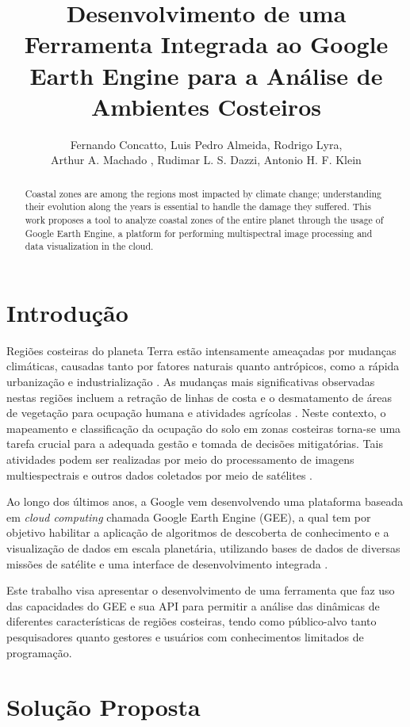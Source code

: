 \documentclass[12pt]{article}
\title{
  Desenvolvimento de uma Ferramenta Integrada ao Google Earth Engine para
  a Análise de Ambientes Costeiros
}
\author{
  Fernando Concatto\inst{1}, Luis Pedro Almeida\inst{3}, Rodrigo Lyra\inst{1},\\
  Arthur A. Machado \inst{2}, Rudimar L. S. Dazzi\inst{1}, Antonio H. F. Klein \inst{2}
}
\begin{document}
\maketitle

\begin{abstract}
  Coastal zones are among the regions most impacted by climate change; understanding their evolution along the years is essential to handle the damage they suffered. This work proposes a tool to analyze coastal zones of the entire planet through the usage of Google Earth Engine, a platform for performing multispectral image processing and data visualization in the cloud.
\end{abstract}

\section{Introdução} \label{sec:intro}

Regiões costeiras do planeta Terra estão intensamente ameaçadas por mudanças climáticas, causadas tanto por fatores naturais quanto antrópicos, como a rápida urbanização e industrialização \cite{Bird1985}. As mudanças mais significativas observadas nestas regiões incluem a retração de linhas de costa e o desmatamento de áreas de vegetação para ocupação humana e atividades agrícolas \cite{Ferreira2006}. Neste contexto, o mapeamento e classificação da ocupação do solo em zonas costeiras torna-se uma tarefa crucial para a adequada gestão e tomada de decisões mitigatórias. Tais atividades podem ser realizadas por meio do processamento de imagens multiespectrais e outros dados coletados por meio de satélites \cite{Bansal2017,Othman2014}.

Ao longo dos últimos anos, a Google vem desenvolvendo uma plataforma baseada em \textit{cloud computing} chamada Google Earth Engine (GEE), a qual tem por objetivo habilitar a aplicação de algoritmos de descoberta de conhecimento e a visualização de dados em escala planetária, utilizando bases de dados de diversas missões de satélite e uma interface de desenvolvimento integrada  \cite{Gorelick2017}.

Este trabalho visa apresentar o desenvolvimento de uma ferramenta que faz uso das capacidades do GEE e sua API para permitir a análise das dinâmicas de diferentes características de regiões costeiras, tendo como público-alvo tanto pesquisadores quanto gestores e usuários com conhecimentos limitados de programação.

\section{Solução Proposta} \label{sec:psolution}
\end{document}
